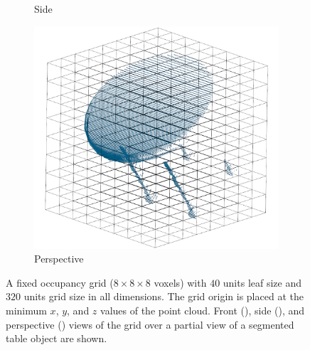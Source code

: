 \begin{figure}[!ht]
\begin{subfigure}{0.325\textwidth}
		\caption{Side}
		\label{subfig:objrecog:fixed:side}
	\end{subfigure}
	\hfill
	\begin{subfigure}{0.325\textwidth}
		\centering
		\includegraphics[width=\linewidth]{Figures/ObjRecog/fixed_persp}
		\caption{Perspective}
		\label{subfig:objrecog:fixed:persp}
	\end{subfigure}
	\hfill
	\caption{A fixed occupancy grid ($8\times8\times8$ voxels) with $40$ units leaf size and $320$ units grid size in all dimensions. The grid origin is placed at the minimum $x$, $y$, and $z$ values of the point cloud. Front (), side (), and perspective () views of the grid over a partial view of a segmented table object are shown.}
	\label{fig:objrecog:fixed}
\end{figure}

